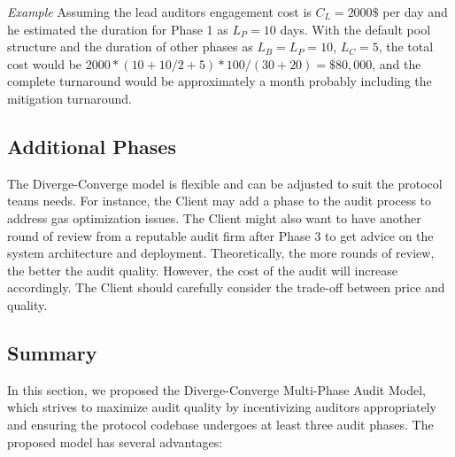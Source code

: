 \documentclass[10pt]{extarticle}
\begin{document}
\emph{Example} Assuming the lead auditor\textquotesingle s engagement
cost is \(C_L = 2000\$\) per day and he estimated the duration for Phase
1 as \(L_P = 10\) days. With the default pool structure and the duration
of other phases as \(L_B = L_P = 10\), \(L_C = 5\), the total cost would
be \(2000 * (10 + 10/2 + 5) * 100 / (30 + 20) = \$80,000\), and the
complete turnaround would be approximately a month probably including
the mitigation turnaround.

\subsection{ Additional Phases}\label{47-additional-phases}

The Diverge-Converge model is flexible and can be adjusted to suit the
protocol team\textquotesingle s needs. For instance, the Client may add
a phase to the audit process to address gas optimization issues. The
Client might also want to have another round of review from a reputable
audit firm after Phase 3 to get advice on the system architecture and
deployment. Theoretically, the more rounds of review, the better the
audit quality. However, the cost of the audit will increase accordingly.
The Client should carefully consider the trade-off between price and
quality.

\subsection{ Summary}\label{48-summary}

In this section, we proposed the Diverge-Converge Multi-Phase Audit
Model, which strives to maximize audit quality by incentivizing auditors
appropriately and ensuring the protocol codebase undergoes at least
three audit phases. The proposed model has several advantages:
\end{document}
